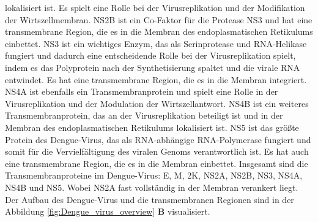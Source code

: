 \documentclass[german,version-2022-01]{uzl-thesis}
\begin{document}
lokalisiert ist. Es spielt eine Rolle bei der Virusreplikation und der Modifikation der Wirtszellmembran. NS2B ist ein Co-Faktor f\"ur die Protease NS3 und hat eine transmembrane Region, die es in die Membran des endoplasmatischen Retikulums einbettet. NS3 ist ein wichtiges Enzym, das als Serinprotease und RNA-Helikase fungiert und dadurch eine entscheidende Rolle bei der Virusreplikation spielt, indem es das Polyprotein nach der Synthetisierung spaltet und die virale RNA entwindet. Es hat eine transmembrane Region, die es in die Membran integriert. NS4A ist ebenfalls ein Transmembranprotein und spielt eine Rolle in der Virusreplikation und der Modulation der Wirtszellantwort. NS4B ist ein weiteres Transmembranprotein, das an der Virusreplikation beteiligt ist und in der Membran des endoplasmatischen Retikulums lokalisiert ist. NS5 ist das gr\"o\ss{}te Protein des Dengue-Virus, das als RNA-abh\"angige RNA-Polymerase fungiert und somit f\"ur die Vervielf\"altigung des viralen Genoms verantwortlich ist. Es hat auch eine transmembrane Region, die es in die Membran einbettet.
Insgesamt sind die Transmembranproteine im Dengue-Virus: E, M, 2K, NS2A, NS2B, NS3, NS4A, NS4B und NS5. Wobei NS2A fast vollst\"andig in der Membran verankert liegt. Der Aufbau des Dengue-Virus und die transmembranen Regionen sind in der Abbildung \ref{fig:Dengue_virus_overview} \textbf{B} visualisiert. 
\end{document}
